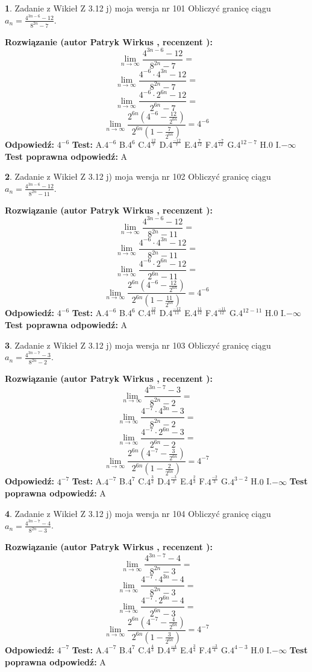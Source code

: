 \documentclass[12pt, a4paper]{article}
\theoremstyle{definition} %
\newtheorem{zad}{}
\newcommand{\zadStart}[1]{\begin{zad}#1\newline}
\newcommand{\zadStop}{\end{zad}}
\newcommand{\rozwStart}[2]{\noindent \textbf{Rozwiązanie (autor #1 , recenzent #2): }\newline}
\newcommand{\rozwStop}{\newline}
\newcommand{\odpStart}{\noindent \textbf{Odpowiedź:}\newline}
\newcommand{\odpStop}{\newline}
\newcommand{\testStart}{\noindent \textbf{Test:}\newline}
\newcommand{\testStop}{\newline}
\newcommand{\kluczStart}{\noindent \textbf{Test poprawna odpowiedź:}\newline}
\newcommand{\kluczStop}{\newline}
\begin{document}
\zadStart{Zadanie z Wikieł Z 3.12 j) moja wersja nr 101}
Obliczyć granicę ciągu $a_{n}=\frac{4^{3n-6}-12}{8^{2n}-7}$.
\zadStop
\rozwStart{Patryk Wirkus}{}
$$\lim\limits_{n\to\infty}\frac{4^{3n-6}-12}{8^{2n}-7}=$$
$$\lim\limits_{n\to\infty}\frac{4^{-6} \cdot 4^{3n}-12}{8^{2n}-7}=$$
$$\lim\limits_{n\to\infty}\frac{4^{-6} \cdot 2^{6n}-12}{2^{6n}-7}=$$
$$\lim\limits_{n\to\infty}\frac{2^{6n}(4^{-6} - \frac{12}{2^{6n}})}{2^{6n}(1-\frac{7}{2^{6n}})}= 4^{-6}$$
\rozwStop
\odpStart
$4^{-6}$
\odpStop
\testStart
A.$4^{-6}$
B.$4^{6}$
C.$4^{\frac{12}{7}}$
D.$4^{\frac{-12}{7}}$
E.$4^{\frac{7}{12}}$
F.$4^{\frac{-7}{12}}$
G.$4^{12-7}$
H.$0$
I.$-\infty$
\testStop
\kluczStart
A
\kluczStop



\zadStart{Zadanie z Wikieł Z 3.12 j) moja wersja nr 102}
Obliczyć granicę ciągu $a_{n}=\frac{4^{3n-6}-12}{8^{2n}-11}$.
\zadStop
\rozwStart{Patryk Wirkus}{}
$$\lim\limits_{n\to\infty}\frac{4^{3n-6}-12}{8^{2n}-11}=$$
$$\lim\limits_{n\to\infty}\frac{4^{-6} \cdot 4^{3n}-12}{8^{2n}-11}=$$
$$\lim\limits_{n\to\infty}\frac{4^{-6} \cdot 2^{6n}-12}{2^{6n}-11}=$$
$$\lim\limits_{n\to\infty}\frac{2^{6n}(4^{-6} - \frac{12}{2^{6n}})}{2^{6n}(1-\frac{11}{2^{6n}})}= 4^{-6}$$
\rozwStop
\odpStart
$4^{-6}$
\odpStop
\testStart
A.$4^{-6}$
B.$4^{6}$
C.$4^{\frac{12}{11}}$
D.$4^{\frac{-12}{11}}$
E.$4^{\frac{11}{12}}$
F.$4^{\frac{-11}{12}}$
G.$4^{12-11}$
H.$0$
I.$-\infty$
\testStop
\kluczStart
A
\kluczStop



\zadStart{Zadanie z Wikieł Z 3.12 j) moja wersja nr 103}
Obliczyć granicę ciągu $a_{n}=\frac{4^{3n-7}-3}{8^{2n}-2}$.
\zadStop
\rozwStart{Patryk Wirkus}{}
$$\lim\limits_{n\to\infty}\frac{4^{3n-7}-3}{8^{2n}-2}=$$
$$\lim\limits_{n\to\infty}\frac{4^{-7} \cdot 4^{3n}-3}{8^{2n}-2}=$$
$$\lim\limits_{n\to\infty}\frac{4^{-7} \cdot 2^{6n}-3}{2^{6n}-2}=$$
$$\lim\limits_{n\to\infty}\frac{2^{6n}(4^{-7} - \frac{3}{2^{6n}})}{2^{6n}(1-\frac{2}{2^{6n}})}= 4^{-7}$$
\rozwStop
\odpStart
$4^{-7}$
\odpStop
\testStart
A.$4^{-7}$
B.$4^{7}$
C.$4^{\frac{3}{2}}$
D.$4^{\frac{-3}{2}}$
E.$4^{\frac{2}{3}}$
F.$4^{\frac{-2}{3}}$
G.$4^{3-2}$
H.$0$
I.$-\infty$
\testStop
\kluczStart
A
\kluczStop



\zadStart{Zadanie z Wikieł Z 3.12 j) moja wersja nr 104}
Obliczyć granicę ciągu $a_{n}=\frac{4^{3n-7}-4}{8^{2n}-3}$.
\zadStop
\rozwStart{Patryk Wirkus}{}
$$\lim\limits_{n\to\infty}\frac{4^{3n-7}-4}{8^{2n}-3}=$$
$$\lim\limits_{n\to\infty}\frac{4^{-7} \cdot 4^{3n}-4}{8^{2n}-3}=$$
$$\lim\limits_{n\to\infty}\frac{4^{-7} \cdot 2^{6n}-4}{2^{6n}-3}=$$
$$\lim\limits_{n\to\infty}\frac{2^{6n}(4^{-7} - \frac{4}{2^{6n}})}{2^{6n}(1-\frac{3}{2^{6n}})}= 4^{-7}$$
\rozwStop
\odpStart
$4^{-7}$
\odpStop
\testStart
A.$4^{-7}$
B.$4^{7}$
C.$4^{\frac{4}{3}}$
D.$4^{\frac{-4}{3}}$
E.$4^{\frac{3}{4}}$
F.$4^{\frac{-3}{4}}$
G.$4^{4-3}$
H.$0$
I.$-\infty$
\testStop
\kluczStart
A
\kluczStop
\end{document}
